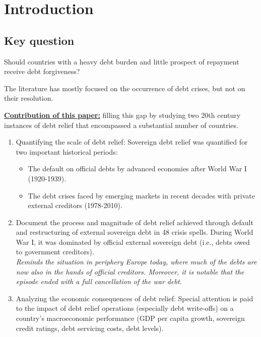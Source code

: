 \chapter{Introduction}
\label{chapter:introduction}

\section{Key question}

Should countries with a heavy debt burden and little prospect of repayment receive debt forgiveness?

The literature has mostly focused on the occurrence of debt crises, but not on their resolution.

\underline{\textbf{Contribution of this paper:}}
filling this gap by studying two 20th century instances of debt relief
that encompassed a substantial number of countries.

\begin{enumerate}
    \item Quantifying the scale of debt relief: Sovereign debt relief was quantified for two important historical periods:
        \begin{itemize}
            \item The default on official debts by advanced economies after World War I (1920-1939).
            \item The debt crises faced by emerging markets in recent decades with private external creditors (1978-2010).
        \end{itemize}
    \item Document the process and magnitude of debt relief achieved through default and restructuring of external sovereign debt in 48 crisis spells.
        During World War I, it was dominated by official external sovereign debt (i.e., debts owed to government creditors). \\
        \emph{Reminds the situation in periphery Europe today, where much of the debts are now also in the hands of official creditors. 
        Moreover, it is notable that the episode ended with a full cancellation of the war debt.}
    \item Analyzing the economic consequences of debt relief: Special attention is paid to the impact of debt relief operations (especially debt write-offs)
    on a country's macroeconomic performance (GDP per capita growth, sovereign credit ratings, debt servicing costs, debt levels).
\end{enumerate}

